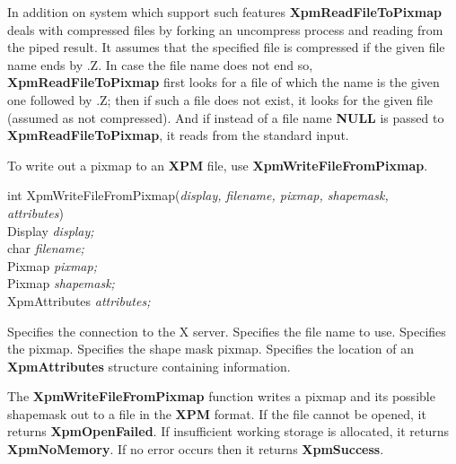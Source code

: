 In addition on system which support such features {\bf XpmReadFileToPixmap}
deals with compressed files by forking an uncompress process and reading from
the piped result. It assumes that the specified file is compressed if the
given file name ends by .Z. In case the file name does not end so, {\bf
XpmReadFileToPixmap} first looks for a file of which the name is the given one
followed by .Z; then if such a file does not exist, it looks for the given
file (assumed as not compressed). And if instead of a file name {\bf NULL} is
passed to {\bf XpmReadFileToPixmap}, it reads from the standard input.

\vspace{.5cm}
To write out a pixmap to an {\bf XPM} file, use {\bf XpmWriteFileFromPixmap}.

\begin{flushleft} 

int XpmWriteFileFromPixmap({\it display, filename, pixmap, shapemask,\\
\hspace{3cm}attributes})\\

\hspace{1cm}Display {\it *display;}\\
\hspace{1cm}char {\it *filename;}\\
\hspace{1cm}Pixmap {\it pixmap;}\\
\hspace{1cm}Pixmap {\it shapemask;}\\
\hspace{1cm}XpmAttributes {\it *attributes;}

\end{flushleft}

\begin{description}

 Specifies the connection to the X server.
 Specifies the file name to use.
 Specifies the pixmap.
 Specifies the shape mask pixmap.
 Specifies the location of an {\bf XpmAttributes} structure
containing information.

\end{description} 

The {\bf XpmWriteFileFromPixmap} function writes a pixmap and its possible
shapemask out to a file in the {\bf XPM} format. If the file cannot be opened,
it returns {\bf XpmOpenFailed}. If insufficient working storage is
allocated, it returns {\bf XpmNoMemory}. If no error occurs then it
returns {\bf XpmSuccess}.

